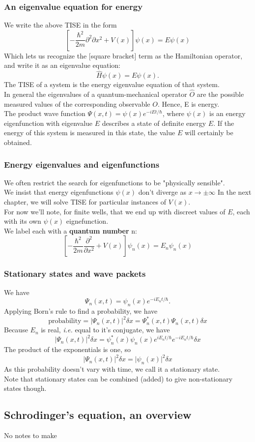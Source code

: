 \documentclass{article}
\begin{document}
\subsubsection{An eigenvalue equation for energy}
We write the above TISE in the form
$$\left[ - \frac{\hbar^2}{2m} {\partial^2}{\partial x^2} + V(x) \right] \psi(x) = E\psi(x) $$
Which lets us recognize the [square bracket] term as the Hamiltonian operator, and write it as an eigenvalue equation:
$$ \hat{H}\psi(x) = E\psi(x). $$
The TISE of a system is the energy eigenvalue equation of that system.\\
In general the eigenvalues of a quantum-mechanical operator $\hat{O}$ are the possible measured values of the corresponding observable $O$. Hence, E is energy.\\
The product wave function $\Psi(x,t) = \psi(x)e^{-iEt/\hbar}$, where $\psi(x)$ is an energy eigenfunction with eigenvalue $E$ describes a state of definite energy $E$. If the energy of this system is measured in this state, the value $E$ will certainly be obtained.

\subsubsection{Energy eigenvalues and eigenfunctions}
We often restrict the search for eigenfunctions to be "physically sensible".\\
We insist that energy eigenfunctions $\psi(x)$ don't diverge as $x \rightarrow \pm\infty$
In the next chapter, we will solve TISE for particular instances of $V(x)$.\\
For now we'll note, for finite wells, that we end up with discreet values of $E$, each with its own $\psi(x)$ eignefunction.\\
We label each with a \textbf{quantum number} n:
$$ \left[ - \frac{\hbar^2}{2m} \frac{\partial^2}{\partial x^2} + V(x)\right] \psi_n(x) = E_n\psi_n(x) $$

\subsubsection{Stationary states and wave packets}
We have
$$\Psi_n(x,t) = \psi_n(x)e^{-iE_n t/\hbar}.$$
Applying Born's rule to find a probability, we have
$$ \textrm{probability} = \lvert \Psi_n(x,t) \rvert^2 \delta x = \Psi_n^*(x,t)\Psi_n(x,t) \delta x $$
Because $E_n$ is real, \emph{i.e.} equal to it's conjugate, we have
$$ \lvert \Psi_n(x,t) \rvert^2 \delta x = \psi^*_n(x)\psi_n(x) e^{iE_n t/\hbar} e^{-i E_n t /\hbar}\delta x $$
The product of the exponentials is one, so
$$ \lvert \Psi_n(x,t) \rvert^2 \delta x = \lvert \psi_n(x)\rvert^2\delta x $$
As this probability doesn't vary with time, we call it a stationary state.\\
Note that stationary states can be combined (added) to give non-stationary states though.\\

\subsection{Schrodinger's equation, an overview}
No notes to make
\end{document}
